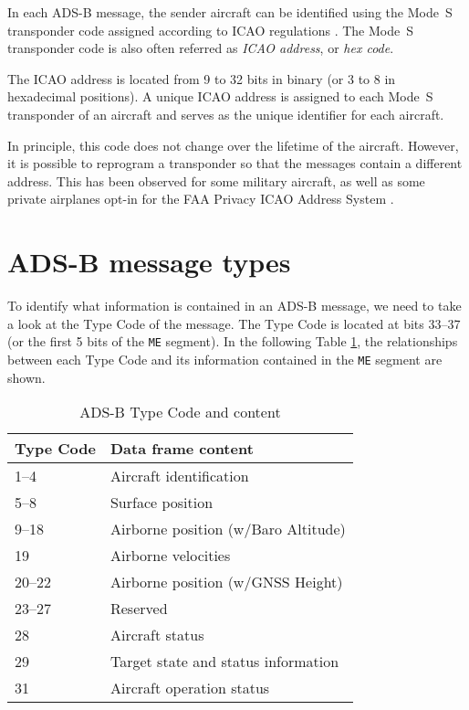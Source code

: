 In each ADS-B message, the sender aircraft can be identified using the Mode~S transponder code assigned according to ICAO regulations \cite{blythe2011}. The Mode~S transponder code is also often referred as \emph{ICAO address}, or \emph{hex code}. 

The ICAO address is located from 9 to 32 bits in binary (or 3 to 8 in hexadecimal positions). A unique ICAO address is assigned to each Mode~S transponder of an aircraft and serves as the unique identifier for each aircraft. 

In principle, this code does not change over the lifetime of the aircraft. However, it is possible to reprogram a transponder so that the messages contain a different address. This has been observed for some military aircraft, as well as some private airplanes opt-in for the FAA Privacy ICAO Address System \cite{gray2019}.


\section{ADS-B message types}

To identify what information is contained in an ADS-B message, we need to take a look at the Type Code of the message. The Type Code is located at bits 33--37 (or the first 5 bits of the \texttt{ME} segment). In the following Table \ref{tb:adsb-tc}, the relationships between each Type Code and its information contained in the \texttt{ME} segment are shown.

\begin{table}[ht]
\centering
\caption{ADS-B Type Code and content}
\label{tb:adsb-tc}
\begin{tabular}{|l|l|}
\hline
\textbf{Type Code} & \textbf{Data frame content} \\  \hline \hline
1--4     & Aircraft identification              \\  \hline
5--8     & Surface position                     \\  \hline
9--18    & Airborne position (w/Baro Altitude) \\  \hline
19        & Airborne velocities                  \\  \hline
20--22   & Airborne position (w/GNSS Height)   \\  \hline
23--27   & Reserved                             \\  \hline
28        & Aircraft status                      \\  \hline
29        & Target state and status information  \\  \hline
31        & Aircraft operation status            \\  \hline
\end{tabular}
\end{table}


